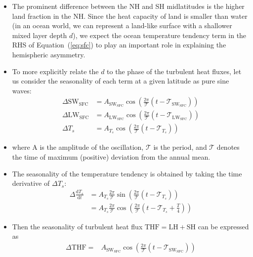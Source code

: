 \documentclass{ametsocV5}
\begin{document}
\begin{itemize}
\begin{equation}
        \end{equation}
  \item The prominent difference between the NH and SH midlatitudes is the higher land fraction in the NH. Since the heat capacity of land is smaller than water (in an ocean world, we can represent a land-like surface with a shallower mixed layer depth $d$), we expect the ocean temperature tendency term in the RHS of Equation~(\ref{eq:sfc}) to play an important role in explaining the hemispheric asymmetry.
  \item To more explicitly relate the $d$ to the phase of the turbulent heat fluxes, let us consider the seasonality of each term at a given latitude as pure sine waves:
        \begin{align}
          \Delta \mathrm{SW}_{\mathrm{SFC}} &= A_{\mathrm{SW_{SFC}}}\cos\left(\frac{2\pi}{\mathcal{T}}(t-\mathscr{T}_{\mathrm{SW_{SFC}}})\right) \\
          \Delta \mathrm{LW}_{\mathrm{SFC}} &= A_{\mathrm{LW_{SFC}}}\cos\left(\frac{2\pi}{\mathcal{T}}(t-\mathscr{T}_{\mathrm{LW_{SFC}}})\right) \\
          \Delta T_{s} &= A_{T_{s}}\cos\left(\frac{2\pi}{\mathcal{T}}(t-\mathscr{T}_{T_{s}})\right)
        \end{align}
  \item where A is the amplitude of the oscillation, $\mathcal{T}$ is the period, and $\mathscr{T}$ denotes the time of maximum (positive) deviation from the annual mean.
  \item The seasonality of the temperature tendency is obtained by taking the time derivative of $\Delta T_{s}$:
        \begin{align}
          \Delta \frac{\mathrm{d}T_{s}}{\mathrm{d}t} &= A_{T_{s}}\frac{2\pi}{\mathcal{T}}\sin\left(\frac{2\pi}{\mathcal{T}}(t-\mathscr{T}_{T_{s}})\right) \\
                                                      &= A_{T_{s}}\frac{2\pi}{\mathcal{T}}\cos\left(\frac{2\pi}{\mathcal{T}}\left(t-\mathscr{T}_{T_{s}}+\frac{T}{4}\right)\right)
        \end{align}
  \item Then the seasonality of turbulent heat flux $\mathrm{THF=LH+SH}$ can be expressed as
        \begin{equation}
          \begin{aligned}
            \Delta \mathrm{THF} =& A_{\mathrm{SW_{SFC}}}\cos\left(\frac{2\pi}{\mathcal{T}}(t-\mathscr{T}_{\mathrm{SW_{SFC}}})\right) \\

\end{aligned}
\end{equation}
\end{itemize}
\end{document}

